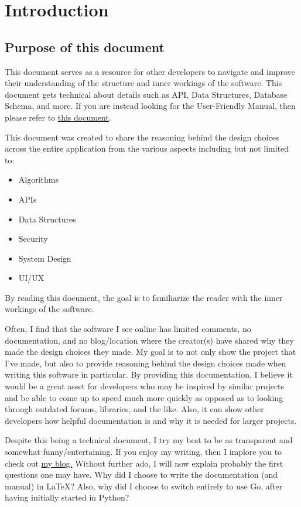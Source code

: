 \section{Introduction}

\subsection{Purpose of this document}
This document serves as a resource for other developers to navigate
and improve their understanding of the structure and inner workings
of the software. This document gets technical about details such as API, Data
Structures, Database Schema, and more.
If you are instead looking for the User-Friendly Manual, then
please refer to
\href{https://github.com/EZRA-DVLPR/GameList/blob/main/docs/PDF/Manual.pdf}{this
document}.

This document was created to share the reasoning behind the design
choices across the entire
application from the various aspects including but not limited to:
\begin{itemize}
	\item Algorithms
	\item APIs
	\item Data Structures
	\item Security
	\item System Design
	\item UI/UX
\end{itemize}
By reading this document, the goal is to familiarize the reader with
the inner workings of the software.

Often, I find that the software I see online has limited comments, no
documentation, and no blog/location where the creator(s) have shared
why they made the design choices they made.
My goal is to not only show the project that I've made, but also to
provide reasoning behind the design choices made
when writing this software in particular. By providing this documentation, I
believe it would be a great asset for
developers who may be inspired by similar projects and be able to
come up to speed much more quickly as opposed as to looking through
outdated forums, libraries, and the like.
Also, it can show other developers how helpful
documentation is and why it is needed for larger projects.

Despite this being a technical document, I try my best to be as
transparent and somewhat funny/entertaining. If you enjoy my writing,
then I implore you to check out
\href{https://personal-website-ezra-dvlpr.vercel.app/blog}{my blog.}
Without further ado, I will now explain probably the first questions
one may have.
Why did I choose to write the documentation (and manual) in \LaTeX?
Also, why did I choose to switch entirely to use Go, after having
initially started in Python?

